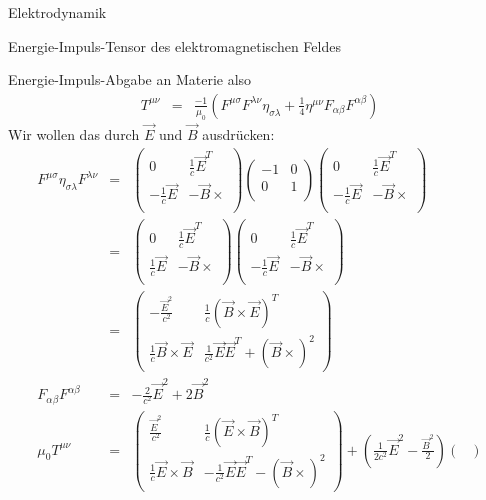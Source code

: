\begin{chapter}{\titlestr}
\begin{section}{Elektrodynamik}
\begin{subsection}{Energie-Impuls-Tensor des elektromagnetischen Feldes}
\begin{subsubsection}{Energie-Impuls-Abgabe an Materie}
also
\begin{eqnarray*}
T^{\mu\nu} &=& \frac{-1}{\mu_0}\left(F^{\mu\sigma}F^{\lambda\nu}\eta_{\sigma\lambda}+\frac{1}{4}\eta^{\mu\nu}F_{\alpha\beta}F^{\alpha\beta}\right)
\end{eqnarray*}
Wir wollen das durch $\vec{E}$ und $\vec{B}$ ausdrücken:
\begin{eqnarray*}
F^{\mu\sigma}\eta_{\sigma\lambda}F^{\lambda\nu}&=&
\begin{pmatrix}
0 &\frac{1}{c}\vec{E}^T\\
-\frac{1}{c}\vec{E} &-\vec{B}\times\\
\end{pmatrix}
\begin{pmatrix}
-1 & 0\\
0 &1\\
\end{pmatrix}
\begin{pmatrix}
0 &\frac{1}{c}\vec{E}^T\\
-\frac{1}{c}\vec{E} &-\vec{B}\times\\
\end{pmatrix}\\
&=&
\begin{pmatrix}
0 &\frac{1}{c}\vec{E}^T\\
\frac{1}{c}\vec{E} &-\vec{B}\times\\
\end{pmatrix}
\begin{pmatrix}
0 &\frac{1}{c}\vec{E}^T\\
-\frac{1}{c}\vec{E} &-\vec{B}\times\\
\end{pmatrix}\\
&=&
\begin{pmatrix}
-\frac{\vec{E}^2}{c^2} &\frac{1}{c}\left(\vec{B}\times\vec{E}\right)^T\\
\frac{1}{c}\vec{B}\times\vec{E} &\frac{1}{c^2}\vec{E}\vec{E}^T+\left(\vec{B}\times\right)^2
\end{pmatrix}\\
F_{\alpha\beta}F^{\alpha\beta} &=& -\frac{2}{c^2}\vec{E}^2+2\vec{B}^2\\
\mu_0T^{\mu\nu} &=&\begin{pmatrix}
\frac{\vec{E}^2}{c^2} &\frac{1}{c}\left(\vec{E}\times\vec{B}\right)^T\\
\frac{1}{c}\vec{E}\times\vec{B} &-\frac{1}{c^2}\vec{E}\vec{E}^T-\left(\vec{B}\times\right)^2
\end{pmatrix}
+\left(\frac{1}{2c^2}\vec{E}^2-\frac{\vec{B}^2}{2}\right)\begin{pmatrix}

\end{pmatrix}
\end{eqnarray*}
\end{subsubsection}
\end{subsection}
\end{section}
\end{chapter}
